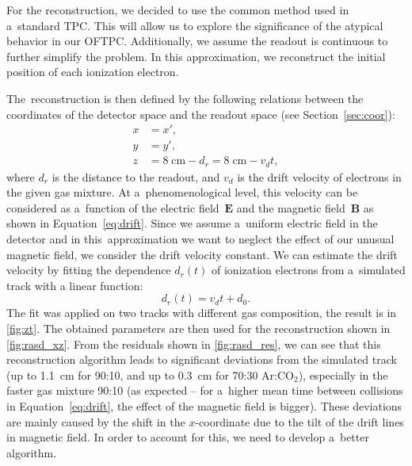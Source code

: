 		For the reconstruction, we decided to use the common method used in a~standard \ac{TPC}. This will allow us to explore the significance of the atypical behavior in our \ac{OFTPC}. Additionally, we assume the readout is continuous to further simplify the problem. In this approximation, we reconstruct the initial position of each ionization electron.
		
		The~reconstruction is then defined by the following relations between the coordinates of the detector space and the readout space (see Section~\ref{sec:coor}):
			\begin{align}
				x &= x',\\
				y &= y',\\
				z &= 8\;\text{cm} - d_r = 8\;\text{cm} - v_d t,
			\end{align}
		where $d_r$ is the distance to the readout, and $v_d$ is the drift velocity of electrons in the given gas mixture. At a~phenomenological level, this velocity can be considered as a~function of the electric field~$\bm{E}$ and the magnetic field~$\bm{B}$ as shown in Equation~\ref{eq:drift}. Since we assume a~uniform electric field in the detector and in this~approximation we want to neglect the effect of our unusual magnetic field, we consider the drift velocity constant. We can estimate the drift velocity by fitting the dependence $d_r(t)$ of ionization electrons from a~simulated track with a linear function:
			\begin{equation}
				d_r(t) = v_d t + d_0.
			\end{equation}
		The fit was applied on two tracks with different gas composition, the result is in \cref{fig:zt}. The obtained parameters are then used for the reconstruction shown in \cref{fig:rasd_xz}. From the residuals shown in \cref{fig:rasd_res}, we can see that this reconstruction algorithm leads to significant deviations from the simulated track (up to 1.1~cm for 90:10, and up to 0.3~cm for 70:30 Ar:CO$_2$), especially in the faster gas mixture 90:10 (as expected -- for a~higher mean time between collisions in Equation~\ref{eq:drift}, the effect of the magnetic field is bigger). These deviations are mainly caused by the shift in the $x$\nobreakdash-coordinate due to the tilt of the drift lines in magnetic field. In order to account for this, we need to develop a~better algorithm.
		
